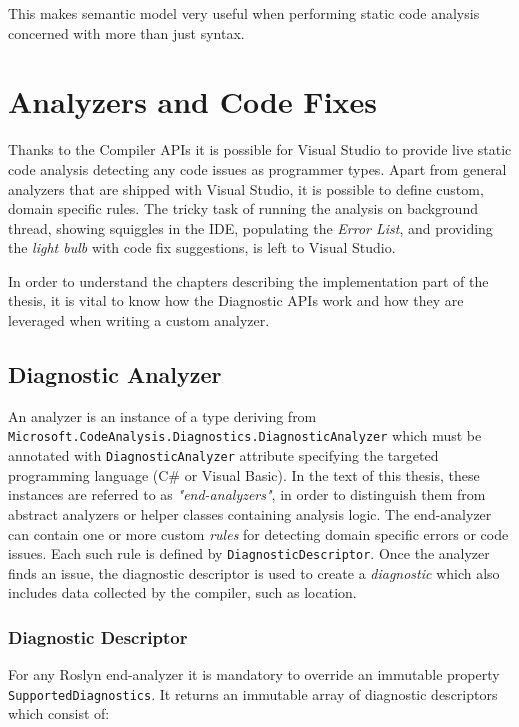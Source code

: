 \documentclass[
  digital, %
  table,   %
  lof,     %
  lot,     %
  oneside,
]{fithesis3}
\begin{document}
This makes semantic model very useful when performing static code analysis concerned with more than just syntax.
 
\section{Analyzers and Code Fixes}
\label{sec:analyzers-and-code-fixes}
Thanks to the Compiler APIs it is possible for Visual Studio to provide live static code analysis detecting any code issues as programmer types. Apart from general analyzers that are shipped with Visual Studio, it is possible to define custom, domain specific rules. The tricky task of running the analysis on background thread, showing squiggles in the IDE, populating the \textit{Error List}, and providing the \textit{light bulb} with code fix suggestions, is left to Visual Studio.

In order to understand the chapters describing the implementation part of the thesis, it is vital to know how the Diagnostic APIs work and how they are leveraged when writing a custom analyzer.

\subsection{Diagnostic Analyzer}
An analyzer is an instance of a type deriving from \texttt{Microsoft.CodeAnalysis.Diagnostics.DiagnosticAnalyzer} which must be annotated with \texttt{DiagnosticAnalyzer} attribute specifying the targeted programming language (C\# or Visual Basic)\cite{roslyn-succinctly}. In the text of this thesis, these instances are referred to as \textit{"end-analyzers"}, in order to distinguish them from abstract analyzers or helper classes containing analysis logic. The end-analyzer can contain one or more custom \textit{rules} for detecting domain specific errors or code issues. Each such rule is defined by \texttt{DiagnosticDescriptor}. Once the analyzer finds an issue, the diagnostic descriptor is used to create a \textit{diagnostic} which also includes data collected by the compiler, such as location.

\subsubsection{\textbf{Diagnostic Descriptor}}
For any Roslyn end-analyzer it is mandatory to override an immutable property \texttt{SupportedDiagnostics}. It returns an immutable array of diagnostic descriptors which consist of:
\end{document}
